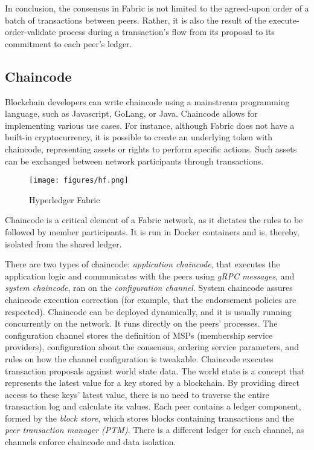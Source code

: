 \documentclass[12pt,a4paper]{article}
\theoremstyle{definition}
\begin{document}
In conclusion, the consensus in Fabric is not limited to the agreed-upon order of a batch of transactions between peers. Rather, it is also the result of the execute-order-validate process during a transaction's flow from its proposal to its commitment to each peer's ledger.

\subsection{Chaincode}

Blockchain developers can write chaincode using a mainstream programming language, such as Javascript, GoLang, or Java. Chaincode allows for implementing various use cases. For instance, although Fabric does not have a built-in cryptocurrency, it is possible to create an underlying token with chaincode, representing assets or rights to perform specific actions. Such assets can be exchanged between network participants through transactions.



\begin{figure}[h]

\texttt{[image: figures/hf.png]}
\centering
\caption{Hyperledger Fabric}
\label{fig:hf}
\end{figure}

Chaincode is a critical element of a Fabric network, as it dictates the rules to be followed by member participants. It is run in Docker containers and is, thereby, isolated from the shared ledger.

There are two types of chaincode: \emph{application chaincode}, that executes the application logic and communicates with the peers using \textit{gRPC messages}, and \emph{system chaincode}, ran on the \textit{configuration channel}. System chaincode assures chaincode execution correction (for example, that the endorsement policies are respected). Chaincode can be deployed dynamically, and it is usually running concurrently on the network.  It runs directly on the peers' processes. The configuration channel stores the definition of MSPs (membership service providers), configuration about the consensus, ordering service parameters, and rules on how the channel configuration is tweakable. Chaincode executes transaction proposals against world state data. The world state is a concept that represents the latest value for a key stored by a blockchain. By providing direct access to these keys' latest value, there is no need to traverse the entire transaction log and calculate its values. Each peer contains a ledger component, formed by the \textit{block store}, which stores blocks containing transactions and the \textit{peer transaction manager (PTM)}. There is a different ledger for each channel, as channels enforce chaincode and data isolation.
\end{document}
